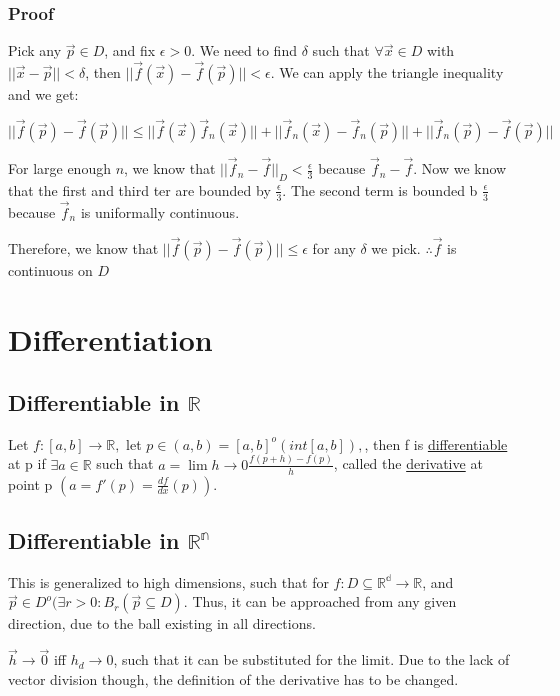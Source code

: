 \documentclass[11 pt, twoside]{article}
\begin{document}
\subsubsection{Proof}
Pick any $\vec{p} \in D$, and fix $\epsilon > 0$. We need to find $\delta$
such that $\forall \vec{x} \in D$ with $||\vec{x} - \vec{p}|| < \delta$,
then $||\vec{f}(\vec{x}) - \vec{f}(\vec{p})|| < \epsilon$. 
We can apply the triangle inequality and we get:

$$||\vec{f}(\vec{p}) - \vec{f}(\vec{p})|| \leq ||\vec{f}(\vec{x}) 
\vec{f}_n(\vec{x})|| + ||\vec{f}_n(\vec{x}) - \vec{f}_n(\vec{p})|| +
||\vec{f}_n(\vec{p}) - \vec{f}(\vec{p})||$$

For large enough $n$, we know that $||\vec{f}_n - \vec{f}||_D < \frac{\epsilon}{3}$
because $\vec{f}_n - \vec{f}$. Now we know that the first and third ter
are bounded by $\frac{\epsilon}{3}$. The second term is bounded b
$\frac{\epsilon}{3}$ because $\vec{f}_n$ is uniformally continuous.

Therefore, we know that $||\vec{f}(\vec{p}) - \vec{f}(\vec{p})|| \le
\epsilon$ for any $\delta$ we pick. $\therefore \vec{f}$ is continuous on $D$

\section{Differentiation}

\subsection{Differentiable in $\mathbb{R}$}
Let $f: [a, b] \to \mathbb{R},$ let $p \in (a, b) = [a, b]^o (int [a, b]),$, then f is \underline{differentiable} at p if $ \exists a \in \mathbb{R}$ such that $a = \lim{h \to 0} \frac{f(p+h) - f(p)}{h}$, called the \underline{derivative} at point p $(a = f'(p) = \frac{df}{dx}(p)).$

\subsection{Differentiable in $\mathbb{R^n}$}
This is generalized to high dimensions, such that for $f: D \subseteq \mathbb{R^d} \to \mathbb{R}$, and $\vec{p} \in D^o (\exists r > 0: B_r(\vec{p} \subseteq D)$. Thus, it can be approached from any given direction, due to the ball existing in all directions.

$\vec{h} \to \vec{0}$ iff $h_d \to 0$, such that it can be substituted for the limit. Due to the lack of vector division though, the definition of the derivative has to be changed.
\end{document}
